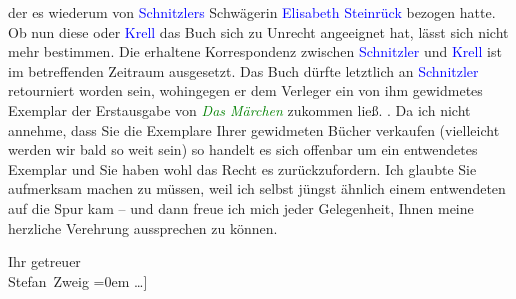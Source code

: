 {{{                  der es wiederum von \textcolor{blue}{Schnitzlers} Schwägerin
                     \textcolor{blue}{Elisabeth Steinrück} bezogen hatte. Ob nun
                  diese oder \textcolor{blue}{Krell} das Buch sich zu Unrecht
                  angeeignet hat, lässt sich nicht mehr bestimmen. Die erhaltene Korrespondenz
                  zwischen \textcolor{blue}{Schnitzler} und \textcolor{blue}{Krell} ist im betreffenden Zeitraum ausgesetzt. Das Buch
                  dürfte letztlich an \textcolor{blue}{Schnitzler} retourniert
                  worden sein, wohingegen er dem Verleger ein von ihm gewidmetes Exemplar der
                  Erstausgabe von \emph{\textcolor{green}{Das Märchen}} zukommen ließ.
               }}}\label{K_L03665-1}. Da ich nicht annehme, dass Sie die Exemplare Ihrer gewidmeten Bücher
               verkaufen (vielleicht werden wir bald so weit sein) so handelt es sich offenbar um
               ein entwendetes Exemplar und Sie haben wohl das Recht es zurückzufordern. Ich glaubte
               Sie aufmerksam machen zu müssen, weil ich selbst jüngst ähnlich einem entwendeten
                  \label{K_L03665-2v}\label{K_L03665-2} auf die Spur
               kam – und dann freue ich mich jeder Gelegenheit, Ihnen meine herzliche Verehrung
               aussprechen zu können. \pend
           
\pstart
           Ihr getreuer{\\[\baselineskip]}\spacefill\mbox{Stefan Zweig}\pend
           \leftskip=0em{}\vspace{1em}
\pstart
           \noindent{}{[}\ldots{]}\pend
           
